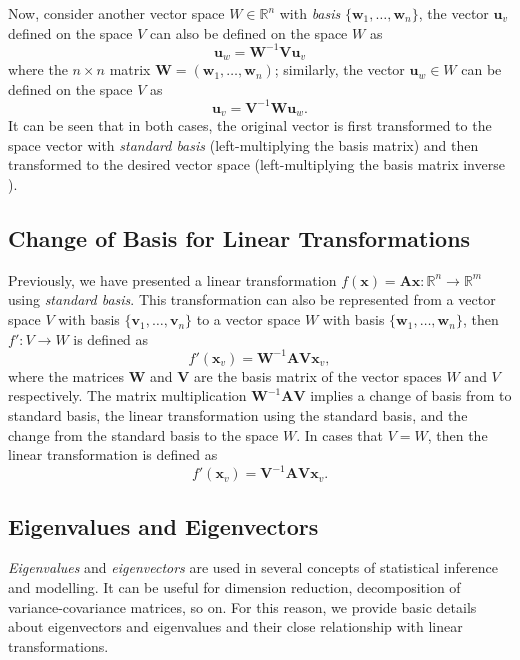 \documentclass[]{book}
\begin{document}
Now, consider another vector space \(W \in \mathbb{R}^n\) with \emph{basis}
\(\{\mathbf{w}_1,\dots,\mathbf{w}_n\}\), the vector \(\mathbf{u}_v\) defined on the space \(V\) can
also be defined on the space \(W\) as
\[\mathbf{u}_w = \mathbf{W}^{-1}\mathbf{V}\mathbf{u}_v\]
where the \(n\times n\) matrix \(\mathbf{W}=(\mathbf{w}_1,\dots,\mathbf{w}_n)\);
similarly, the vector \(\mathbf{u}_w \in W\) can be defined on the space \(V\) as
\[\mathbf{u}_v = \mathbf{V}^{-1}\mathbf{W}\mathbf{u}_w.\]
It can be seen that in both cases, the
original vector is first transformed to the space vector with \emph{standard basis}
(left-multiplying the basis matrix) and
then transformed to the desired vector space (left-multiplying the basis matrix
inverse ).

\hypertarget{change-of-basis-for-linear-transformations}{%
\subsection{Change of Basis for Linear Transformations}\label{change-of-basis-for-linear-transformations}}

Previously, we have presented a linear transformation
\(f(\mathbf{x})=\mathbf{A}\mathbf{x}:\mathbb{R}^n\rightarrow\mathbb{R}^m\)
using \emph{standard basis}. This transformation can also be represented from a vector space
\(V\) with basis \(\{\mathbf{v}_1,\dots,\mathbf{v}_n\}\) to a vector space \(W\) with basis
\(\{\mathbf{w}_1,\dots,\mathbf{w}_n\}\), then \(f': V \rightarrow W\) is defined as
\[f'(\mathbf{x}_v) = \mathbf{W}^{-1}\mathbf{A}\mathbf{V}\mathbf{x}_v,\]
where the matrices \(\mathbf{W}\) and \(\mathbf{V}\) are the basis matrix of the vector spaces \(W\)
and \(V\) respectively. The matrix multiplication \(\mathbf{W}^{-1}\mathbf{A}\mathbf{V}\) implies a
change of basis from  to standard basis, the linear transformation using the
standard basis, and the change from the standard basis to the space \(W\). In cases
that \(V=W\), then the linear transformation is defined as
\[f'(\mathbf{x}_v) = \mathbf{V}^{-1}\mathbf{A}\mathbf{V}\mathbf{x}_v.\]

\hypertarget{eigenvalues-and-eigenvectors}{%
\subsection{Eigenvalues and Eigenvectors}\label{eigenvalues-and-eigenvectors}}

\emph{Eigenvalues} and \emph{eigenvectors} are used in several concepts of statistical inference
and modelling. It can be useful for dimension reduction, decomposition of
variance-covariance matrices, so on. For this reason, we provide basic details about
eigenvectors and eigenvalues and their close relationship with linear
transformations.
\end{document}
